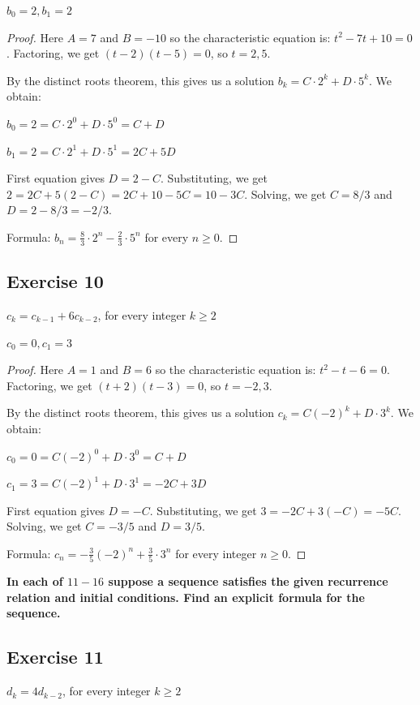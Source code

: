 \documentclass[14pt]{extarticle}
\newcommand{\cy}{\color{cyan}}
\begin{document}
\(b_0 = 2, b_1 = 2\)

\begin{proof}
Here $A = 7$ and $B = -10$ so the characteristic equation is: \(t^2 - 7t + 10 = 0\). 
Factoring, we get \((t - 2)(t - 5) = 0\), so $t = 2, 5$.

By the distinct roots theorem, this gives us a solution \(b_k = C \cdot 2^k + D \cdot 5^k\). We obtain:

\(b_0 = 2 = C \cdot 2^0 + D \cdot 5^0 = C + D\)

\(b_1 = 2 = C \cdot 2^1 + D \cdot 5^1 = 2C + 5D\)

First equation gives $D = 2 - C$. Substituting, we get \(2 = 2C + 5(2 - C) = 2C + 10 - 5C = 10 - 3C\). Solving, we get
$C = 8/3$ and $D = 2-8/3 = -2/3$.

Formula: \(b_n = \frac{8}{3} \cdot 2^n - \frac{2}{3} \cdot 5^n\) for every \(n \geq 0\).
\end{proof}

\subsection{Exercise 10}
\(c_k = c_{k-1} + 6c_{k-2}\), for every integer \(k \geq 2\)

\(c_0 = 0, c_1 = 3\)

\begin{proof}
Here $A = 1$ and $B = 6$ so the characteristic equation is: \(t^2 - t - 6 = 0\). 
Factoring, we get \((t + 2)(t - 3) = 0\), so $t = -2, 3$.

By the distinct roots theorem, this gives us a solution \(c_k = C(-2)^k + D \cdot 3^k\). We obtain:

\(c_0 = 0 = C(-2)^0 + D \cdot 3^0 = C + D\)

\(c_1 = 3 = C(-2)^1 + D \cdot 3^1 = -2C + 3D\)

First equation gives $D = - C$. Substituting, we get \(3 = -2C + 3(- C) = - 5C\). Solving, we get $C = -3/5$ and $D = 3/5$.

Formula: \(c_n = -\frac{3}{5}(-2)^n + \frac{3}{5} \cdot 3^n\) for every integer \(n \geq 0\).
\end{proof}

{\bf \cy In each of $11-16$ suppose a sequence satisfies the given recurrence relation and initial conditions. Find an explicit formula for the sequence.}

\subsection{Exercise 11}
\(d_k = 4d_{k-2}\), for every integer \(k \geq 2\)
\end{document}

